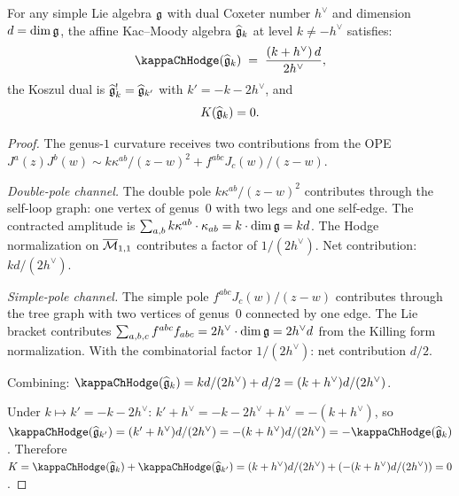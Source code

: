 \begin{theorem}
\label{thm:thqg-IV-km-K}
For any simple Lie algebra $\mathfrak{g}$ with dual Coxeter number $h^\vee$
and dimension $d = \dim\mathfrak{g}$, the affine Kac--Moody algebra
$\widehat{\mathfrak{g}}_k$ at level $k \neq -h^\vee$ satisfies:
\begin{equation}%
\kappaChHodge(\widehat{\fg}_k)
\;=\;
\frac{(k + h^\vee)\, d}{2h^\vee},
\end{equation}
the Koszul dual is
$\widehat{\mathfrak{g}}_k^! = \widehat{\mathfrak{g}}_{k'}$
with $k' = -k - 2h^\vee$, and
\begin{equation}%
K(\widehat{\fg}_k) = 0.
\end{equation}
\end{theorem}

\begin{proof}
The genus-$1$ curvature receives two contributions from the OPE
$J^a(z)J^b(w) \sim k\kappa^{ab}/(z-w)^2 + f^{abc}J_c(w)/(z-w)$.

\emph{Double-pole channel.}
The double pole $k\kappa^{ab}/(z-w)^2$ contributes through the
self-loop graph: one vertex of genus~$0$ with two legs and one
self-edge. The contracted amplitude is
$\sum_{a,b} k\kappa^{ab} \cdot \kappa_{ab} = k \cdot \dim\mathfrak{g} = kd$.
The Hodge normalization on $\overline{\mathcal{M}}_{1,1}$ contributes a factor
of $1/(2h^\vee)$. Net contribution: $kd/(2h^\vee)$.

\emph{Simple-pole channel.}
The simple pole $f^{abc}J_c(w)/(z-w)$ contributes through the tree
graph with two vertices of genus~$0$ connected by one edge. The
Lie bracket contributes $\sum_{a,b,c} f^{abc}f_{abc}
= 2h^\vee \cdot \dim\mathfrak{g} = 2h^\vee d$ from the Killing form
normalization. With the combinatorial factor $1/(2h^\vee)$:
net contribution $d/2$.

Combining: $\kappaChHodge(\widehat{\fg}_k)
= kd/(2h^\vee) + d/2 = (k + h^\vee)d/(2h^\vee)$.

Under $k \mapsto k' = -k - 2h^\vee$:
$k' + h^\vee = -k - 2h^\vee + h^\vee = -(k + h^\vee)$, so
$\kappaChHodge(\widehat{\fg}_{k'})
= (k'+h^\vee)d/(2h^\vee)
= -(k + h^\vee)d/(2h^\vee) = -\kappaChHodge(\widehat{\fg}_k)$.
Therefore $K = \kappaChHodge(\widehat{\fg}_k) + \kappaChHodge(\widehat{\fg}_{k'})
= (k+h^\vee)d/(2h^\vee) + (-(k+h^\vee)d/(2h^\vee)) = 0$.
\end{proof}

